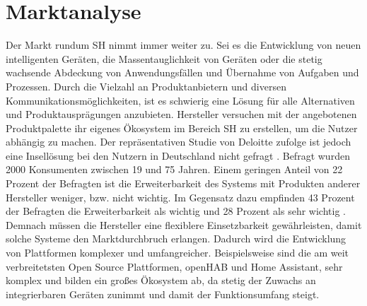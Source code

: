 \section{Marktanalyse}
\label{sec:marktanalyse}
    Der Markt rundum \acl{SH} nimmt immer weiter zu. Sei es die Entwicklung von neuen intelligenten Geräten, die 
    Massentauglichkeit von Geräten %
    oder die stetig wachsende Abdeckung von Anwendungsfällen und Übernahme von Aufgaben und Prozessen. Durch die Vielzahl an 
    Produktanbietern und diversen Kommunikationsmöglichkeiten, ist es schwierig eine Lösung für alle Alternativen und 
    Produktausprägungen anzubieten. Hersteller versuchen mit der angebotenen Produktpalette ihr eigenes Ökosystem im Bereich 
    \acl{SH} zu erstellen, um die Nutzer abhängig zu machen. Der repräsentativen Studie von Deloitte zufolge ist jedoch eine 
    Insellösung bei den Nutzern in Deutschland nicht gefragt \cite{deloitte2018}. Befragt wurden 2000 Konsumenten zwischen 
    19 und 75 Jahren. Einem geringen Anteil von 22 Prozent der 
    Befragten ist die Erweiterbarkeit des Systems mit Produkten anderer Hersteller weniger, bzw. nicht wichtig. Im Gegensatz dazu 
    empfinden 43 Prozent der Befragten die Erweiterbarkeit als wichtig und 28 Prozent als sehr wichtig \cite{deloitte2018}. 
    Demnach müssen die Hersteller eine flexiblere Einsetzbarkeit gewährleisten, damit solche Systeme den Marktdurchbruch 
    erlangen. Dadurch wird die Entwicklung von Plattformen komplexer und umfangreicher. Beispielsweise sind die am weit 
    verbreitetsten Open Source Plattformen, openHAB und Home Assistant, sehr komplex und bilden ein großes Ökosystem ab, da 
    stetig der Zuwachs an integrierbaren Geräten zunimmt und damit der Funktionsumfang steigt.  

